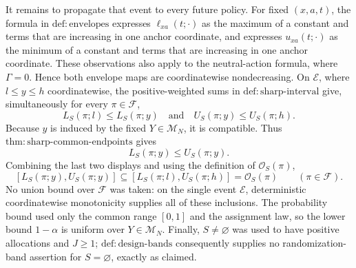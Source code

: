 It remains to propagate that event to every future policy.  For fixed \((x,a,t)\), the formula in \(\mathrm{def{:}envelopes}\) expresses \(\ell_{xa}(t;\cdot)\) as the maximum of a constant and terms that are increasing in one anchor coordinate, and expresses \(u_{xa}(t;\cdot)\) as the minimum of a constant and terms that are increasing in one anchor coordinate.  These observations also apply to the neutral-action formula, where \(\Gamma=0\).  Hence both envelope maps are coordinatewise nondecreasing.  On \(\mathcal E\), where \(l\leq y\leq h\) coordinatewise, the positive-weighted sums in \(\mathrm{def{:}sharp\text{-}interval}\) give, simultaneously for every \(\pi\in\mathcal F\),
\[
L_S(\pi;l)\leq L_S(\pi;y)
\quad\text{and}\quad
U_S(\pi;y)\leq U_S(\pi;h).
\]
Because \(y\) is induced by the fixed \(Y\in\mathcal M_N\), it is compatible.  Thus \(\mathrm{thm{:}sharp\text{-}common\text{-}endpoints}\) gives
\[
L_S(\pi;y)\leq U_S(\pi;y).
\]
Combining the last two displays and using the definition of \(\mathcal O_S(\pi)\),
\[
[L_S(\pi;y),U_S(\pi;y)]
\subseteq
[L_S(\pi;l),U_S(\pi;h)]
=\mathcal O_S(\pi)
\qquad(\pi\in\mathcal F).
\]
No union bound over \(\mathcal F\) was taken: on the single event \(\mathcal E\), deterministic coordinatewise monotonicity supplies all of these inclusions.  The probability bound used only the common range \([0,1]\) and the assignment law, so the lower bound \(1-\alpha\) is uniform over \(Y\in\mathcal M_N\).  Finally, \(S\neq\varnothing\) was used to have positive allocations and \(J\geq1\); \(\mathrm{def{:}design\text{-}bands}\) consequently supplies no randomization-band assertion for \(S=\varnothing\), exactly as claimed.
